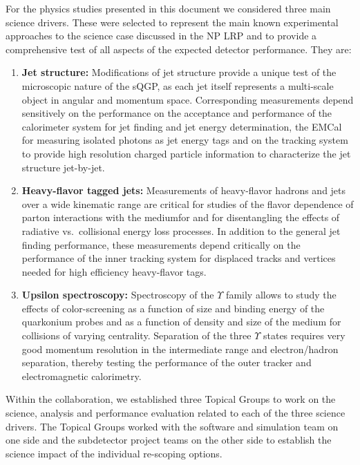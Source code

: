 For the physics studies presented in this document we considered three
main science drivers. These were selected to represent the main known 
experimental approaches to the science case discussed in the NP LRP and
to provide a comprehensive test of all aspects of the expected detector
performance. They are:
\begin{enumerate}
\item {\bf Jet structure:} Modifications of jet structure provide a unique test
of the microscopic nature of the sQGP, as each jet itself represents a multi-scale
object in angular and momentum space. Corresponding measurements depend
sensitively on the performance on the acceptance and performance 
of the calorimeter system for jet finding and jet energy determination, the
EMCal for measuring isolated photons as jet energy tags and on the tracking
system to provide high resolution charged particle information to characterize
the jet structure jet-by-jet.
\item {\bf Heavy-flavor tagged jets:} Measurements of heavy-flavor hadrons 
and jets over a wide kinematic range are critical for studies of
the flavor dependence of parton interactions with the mediumfor and for 
disentangling the effects of radiative vs.\ collisional energy loss processes.
In addition to the general jet finding performance, these measurements depend 
critically on the performance of the inner tracking system for displaced 
tracks and vertices needed for high efficiency heavy-flavor tags.
\item {\bf Upsilon spectroscopy:} Spectroscopy of the $\Upsilon$ family allows
to study the effects of color-screening as a function of size and 
binding energy of the quarkonium probes and as a function of density and size
of the medium for collisions of varying centrality. Separation of the three 
$\Upsilon$ states requires very good momentum resolution in the intermediate
\pt range and electron/hadron separation, thereby testing the performance of 
the outer tracker and electromagnetic calorimetry. 
\end{enumerate}

Within the collaboration, we established three Topical Groups to work 
on the science, analysis and performance evaluation related to each of the 
three science drivers. The Topical Groups worked with the software and simulation
team on one side and the subdetector project teams on the other side to 
establish the science impact of the individual re-scoping options.





